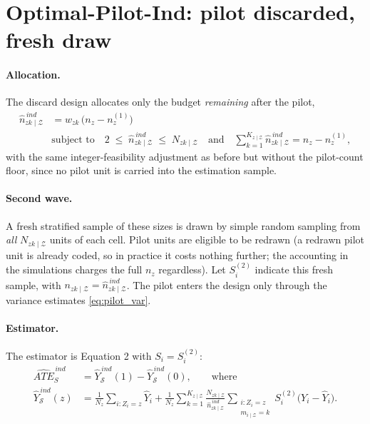 \documentclass[12pt]{article}
\theoremstyle{remark}
\newcommand{\NzkZ}{N_{zk \mid\mathcal{Z}}}
\newcommand{\nzkZ}{n_{zk \mid\mathcal{Z}}}
\newcommand{\nindzkZ}{\hat{n}^{\,ind}_{zk \mid \mathcal{Z}}}
\newcommand{\yhatind}[1]{\hat{Y}^{\,ind}_{\mathcal{S}}(#1)}
\newcommand{\ateind}{\widehat{ATE}_S^{\,ind}}
\newcommand{\cellsum}[1]{\sum_{\substack{i:Z_i=#1 \\ m_{i \mid \mathcal{Z}} = k}}}
\begin{document}
\section{Optimal-Pilot-Ind: pilot discarded, fresh draw}
\label{sec:ind}

\paragraph{Allocation.} The discard design allocates only the budget \emph{remaining} after the pilot,
\begin{equation}
\label{eq:pilot_alloc_ind}
\begin{aligned}
\nindzkZ &= \hat{w}_{zk}\, \big( n_z - n^{(1)}_z \big) \\
&\text{subject to} \quad
2 \;\le\; \nindzkZ \;\le\; \NzkZ
\quad \text{and} \quad
\sum_{k=1}^{K_{z \mid \mathcal{Z}}} \nindzkZ = n_z - n^{(1)}_z ,
\end{aligned}
\end{equation}
with the same integer-feasibility adjustment as before but without the pilot-count floor, since no pilot unit is carried into the estimation sample.

\paragraph{Second wave.} A fresh stratified sample of these sizes is drawn by simple random sampling from \emph{all} $\NzkZ$ units of each cell. Pilot units are eligible to be redrawn (a redrawn pilot unit is already coded, so in practice it costs nothing further; the accounting in the simulations charges the full $n_z$ regardless). Let $S^{(2)}_i$ indicate this fresh sample, with $\nzkZ = \nindzkZ$. The pilot enters the design only through the variance estimates \eqref{eq:pilot_var}.

\paragraph{Estimator.} The estimator is Equation 2 with $S_i = S^{(2)}_i$:
\begin{equation}
\label{eq:pilot_ind_est}
\begin{aligned}
\ateind &= \yhatind{1} - \yhatind{0}, \qquad \text{where} \\
\yhatind{z} &= \frac{1}{N_z} \sum_{i:Z_i=z} \hat{Y}_i
 + \frac{1}{N_z} \sum_{k=1}^{K_{z \mid \mathcal{Z}}} \frac{\NzkZ}{\nindzkZ} \cellsum{z} S^{(2)}_i \big( Y_i - \hat{Y}_i \big).
\end{aligned}
\end{equation}
\end{document}
